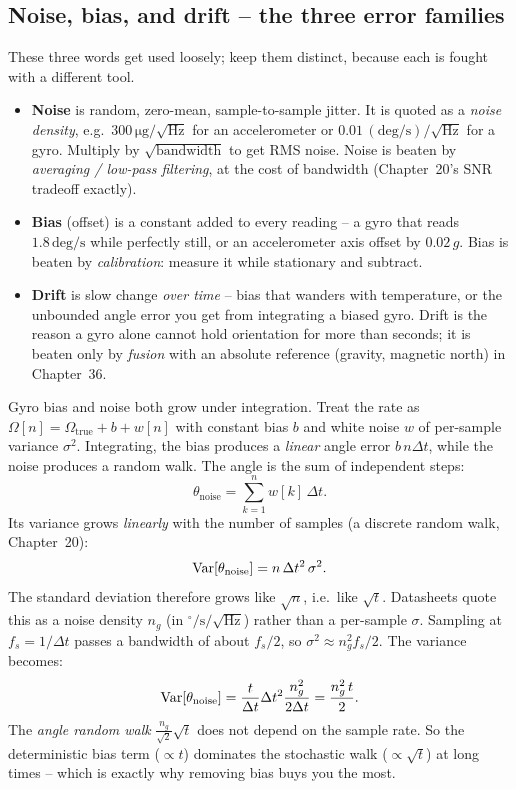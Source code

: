 \subsection{Noise, bias, and drift -- the three error families}

These three words get used loosely; keep them distinct, because each is fought with a
different tool.

\begin{itemize}
\item \textbf{Noise} is random, zero-mean, sample-to-sample jitter. It is quoted as a
  \emph{noise density}, e.g.\ $300\,\mathrm{\mu g/\sqrt{Hz}}$ for an accelerometer or
  $0.01\,\mathrm{(deg/s)/\sqrt{Hz}}$ for a gyro. Multiply by $\sqrt{\text{bandwidth}}$
  to get RMS noise. Noise is beaten by \emph{averaging / low-pass filtering}, at the
  cost of bandwidth (Chapter~20's SNR tradeoff exactly).
\item \textbf{Bias} (offset) is a constant added to every reading -- a gyro that reads
  $1.8\,\mathrm{deg/s}$ while perfectly still, or an accelerometer axis offset by
  $0.02\,g$. Bias is beaten by \emph{calibration}: measure it while stationary and
  subtract.
\item \textbf{Drift} is slow change \emph{over time} -- bias that wanders with
  temperature, or the unbounded angle error you get from integrating a biased gyro.
  Drift is the reason a gyro alone cannot hold orientation for more than seconds; it is
  beaten only by \emph{fusion} with an absolute reference (gravity, magnetic north) in
  Chapter~36.
\end{itemize}

\begin{connectionbox}
Gyro bias and noise both grow under integration. Treat the rate as
$\Omega[n] = \Omega_{\text{true}} + b + w[n]$ with constant bias $b$ and white noise
$w$ of per-sample variance $\sigma^2$. Integrating, the bias produces a \emph{linear}
angle error $b\,n\Delta t$, while the noise produces a random walk. The angle is the
sum of independent steps:
\[ \theta_{\text{noise}} = \sum_{k=1}^n w[k]\,\Delta t. \]
Its variance grows \emph{linearly} with the number of samples (a discrete random walk, Chapter~20):
\[ \operatorname{Var}[\theta_{\text{noise}}] = n\,\Delta t^2\,\sigma^2. \]
The standard deviation therefore grows like $\sqrt{n}$, i.e.\ like $\sqrt{t}$. Datasheets quote this as a noise density $n_g$ (in $^\circ/\mathrm{s}/\sqrt{\mathrm{Hz}}$) rather than a per-sample $\sigma$. Sampling at $f_s = 1/\Delta t$ passes a bandwidth of about $f_s/2$, so $\sigma^2 \approx n_g^2 f_s/2$. The variance becomes:
\[ \operatorname{Var}[\theta_{\text{noise}}] = \frac{t}{\Delta t} \Delta t^2 \frac{n_g^2}{2\Delta t} = \frac{n_g^2\,t}{2}. \]
The \emph{angle random walk} $\frac{n_g}{\sqrt{2}}\sqrt{t}$ does not depend on the sample rate. So the deterministic bias term ($\propto t$) dominates the
stochastic walk ($\propto \sqrt{t}$) at long times -- which is exactly why removing
bias buys you the most.
\end{connectionbox}

